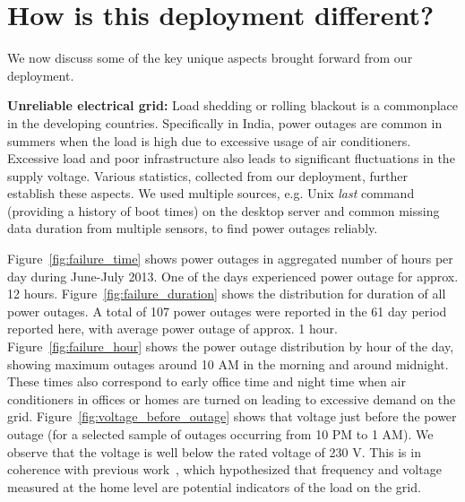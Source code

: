 \documentclass[10pt]{sensys-proc}
\newcommand{\figref}[1]{Figure~\ref{#1}}
\begin{document}
\vspace{-1mm}
\section{How is this deployment different?}
\label{sec:learning}
We now discuss some of the key unique aspects brought forward from our deployment. 

\noindent \textbf{Unreliable electrical grid:} Load shedding or rolling blackout is a commonplace in the developing countries. %
Specifically in India, power outages are common in summers when the load is high due to excessive usage of air conditioners. Excessive load and poor infrastructure also leads to significant fluctuations in the supply voltage. %
Various statistics, collected from our deployment, further establish these aspects. We used multiple sources, e.g. Unix \emph{last} command (providing a history of boot times) on the desktop server and common missing data duration from multiple sensors, to find power outages reliably. 

\figref{fig:failure_time} shows power outages in aggregated number of hours per day during June-July 2013. One of the days experienced power outage for approx. 12 hours. 
 \figref{fig:failure_duration} shows the distribution for duration of all power outages. A total of 107 power outages were reported in the 61 day period reported here, with average power outage of approx. 1 hour. %
\figref{fig:failure_hour} shows the power outage distribution by hour of the day, showing maximum outages around 10 AM in the morning and around midnight. These times also correspond to early office time and night time when air conditioners in offices or homes are turned on leading to excessive demand on the grid. \figref{fig:voltage_before_outage} shows that voltage just before the power outage (for a selected sample of outages occurring from 10 PM to 1 AM). We observe that the voltage is well below the rated voltage of 230 V. This is in coherence with previous work~\cite{nplug}, which hypothesized that frequency and voltage measured at the home level are potential indicators of the load on the grid.
\end{document}
